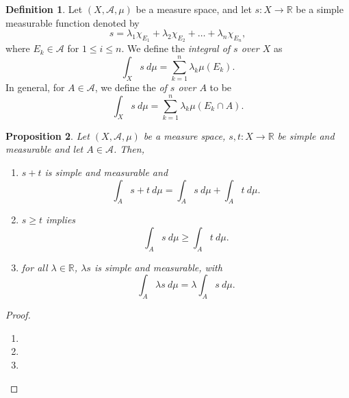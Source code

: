 \documentclass[a4paper, openany]{memoir}
\theoremstyle{definition}
\newtheorem{definition}{Definition}[section]
\theoremstyle{plain}
\newtheorem{proposition}[definition]{Proposition}
\begin{document}
    \begin{definition}
        Let $(X, \mathcal{A}, \mu)$ be a measure space, and let $s \colon X \to \mathbb{R}$ be a simple measurable function denoted by
        \[s = \lambda_1 \chi_{E_1} + \lambda_2 \chi_{E_2} + \dots + \lambda_n \chi_{E_n},\]
        where $E_k \in \mathcal{A}$ for $1 \leq i \leq n$. We define the \emph{integral of $s$ over $X$} as
        \[\int_X s \ d\mu = \sum_{k=1}^n \lambda_k \mu(E_k).\]
        In general, for $A \in \mathcal{A}$, we define the \emph{of $s$ over $A$} to be
        \[\int_X s \ d\mu = \sum_{k=1}^n \lambda_k \mu(E_k \cap A).\]
    \end{definition}

    \begin{proposition}
        Let $(X, \mathcal{A}, \mu)$ be a measure space, $s, t \colon X \to \mathbb{R}$ be simple and measurable and let $A \in \mathcal{A}$. Then,
        \begin{enumerate}
            \item $s + t$ is simple and measurable and
            \[\int_A s + t \ d\mu = \int_A s \ d\mu + \int_A t \ d\mu.\]

            \item $s \geq t$ implies
            \[\int_A s \ d\mu \geq \int_A t \ d\mu.\]

            \item for all $\lambda \in \mathbb{R}$, $\lambda s$ is simple and measurable, with
            \[\int_A \lambda s \ d\mu = \lambda \int_A s \ d\mu.\]
        \end{enumerate}
    \end{proposition}
    \begin{proof}
        \hspace*{0pt}
        \begin{enumerate}
            \item 
            \item 
            \item 
        \end{enumerate}
    \end{proof}
\end{document}
